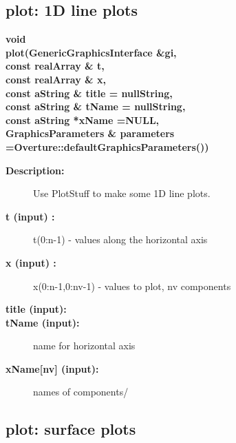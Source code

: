 \subsection{plot: 1D line plots}
 
\begin{flushleft} \textbf{%
void  \\ 
\settowidth{\PlotStuffIncludeArgIndent}{plot(}%
plot(GenericGraphicsInterface \&gi,\\ 
\hspace{\PlotStuffIncludeArgIndent}const realArray \& t, \\ 
\hspace{\PlotStuffIncludeArgIndent}const realArray \& x, \\ 
\hspace{\PlotStuffIncludeArgIndent}const aString \& title  = nullString, \\ 
\hspace{\PlotStuffIncludeArgIndent}const aString \& tName  = nullString,\\ 
\hspace{\PlotStuffIncludeArgIndent}const aString *xName         =NULL,\\ 
GraphicsParameters \& parameters  =Overture::defaultGraphicsParameters()) 
}\end{flushleft}
\begin{description}
\item[{\bf Description:}] 
    Use PlotStuff to make some 1D line plots. 
\item[{\bf t (input) :}]  t(0:n-1) - values along the horizontal axis
\item[{\bf x (input) :}]  x(0:n-1,0:nv-1) - values to plot, nv components
\item[{\bf title (input):}] 
\item[{\bf tName (input):}]  name for horizontal axis
\item[{\bf xName[nv] (input):}]  names of components/
\end{description}
\subsection{plot: surface plots}\label{timeSequence}
 
